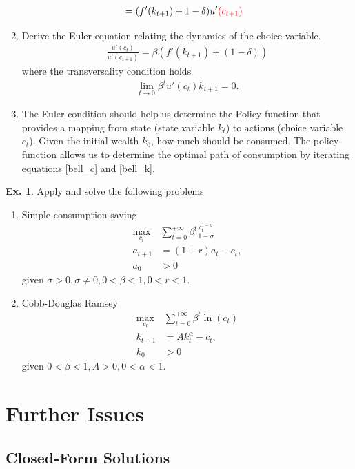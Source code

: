 \documentclass[11pt,a4paper]{book}
\newcommand{\red}[1]{\textcolor{red}{#1}}
\theoremstyle{definition}\newtheorem{definition}{Definition}
\theoremstyle{definition}\newtheorem{fact}{Fact}
\theoremstyle{definition}\newtheorem{remark}{Remark}
\theoremstyle{definition}\newtheorem{ex}{Ex.}
\theoremstyle{definition}\newtheorem{project}{Project}
\theoremstyle{definition}\newtheorem{problem}{Problem}
\theoremstyle{definition}\newtheorem{example}{Example}
\numberwithin{theorem}{section}
\numberwithin{corollary}{chapter}
\numberwithin{assumption}{chapter}
\numberwithin{definition}{chapter}
\numberwithin{prop}{chapter}
\numberwithin{notation}{chapter}
\numberwithin{problem}{chapter}
\numberwithin{example}{chapter}
\numberwithin{fact}{chapter}
\numberwithin{ex}{chapter}
\begin{document}
\begin{enumerate}
\begin{align*}
			&= (f'(k_{t+1}) + 1-\delta)u'\red{ (c_{t+1})}
		\end{align*}
		\item Derive the Euler equation relating the dynamics of the choice variable.
		\begin{align*}
			\frac{u'(c_t)}{u'(c_{t+1})} = \beta (f'(k_{t+1}) + (1-\delta))
		\end{align*}
		where the transversality condition holds
		\begin{align*}
			\lim_{t\to 0} \beta^t u'(c_t) k_{t+1} = 0.
		\end{align*}
		\item The Euler condition should help us determine the Policy function that provides a mapping from state (state variable $k_t$) to actions (choice variable $c_t$). Given the initial wealth $k_0$, how much should be consumed. The policy function
		allows us to determine the optimal path of consumption by iterating equations \eqref{bell_c} and \eqref{bell_k}.
	\end{enumerate}
	
	\begin{ex}
	Apply and solve the following problems
	\begin{enumerate}
		\item Simple consumption-saving \begin{align*}
			\max_{c_t} &\sum^{+\infty}_{t=0} \beta^t \frac{c_t^{1-\sigma}}{1-\sigma} \\
			a_{t+1} &= (1+r) a_t - c_t, \\
			a_0 &> 0
		\end{align*}
		given $\sigma > 0, \sigma \neq 0, 0 < \beta  < 1, 0 < r < 1$.
		\item Cobb-Douglas Ramsey \begin{align*}
			\max_{c_t} &\sum^{+\infty}_{t=0} \beta^t \ln(c_t) \\
			k_{t+1} &= A k_t^\alpha - c_t, \\
			k_0 &> 0
		\end{align*}
		given $0 < \beta < 1, A > 0, 0 < \alpha < 1$.
	\end{enumerate}
	\end{ex}
	
	\section{Further Issues}
	\subsection{Closed-Form Solutions}
\end{document}
